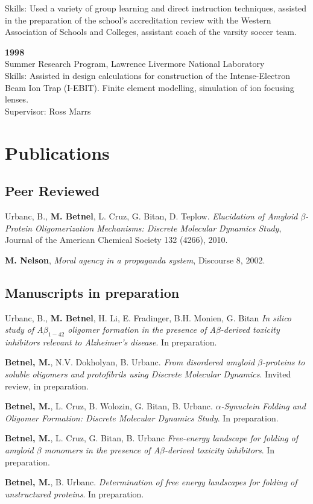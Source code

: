 \documentclass[letterpaper]{article}
\renewenvironment{itemize}{
  \begin{list}{}{
    \setlength{\leftmargin}{1.5em}
  }
}{
  \end{list}
}
\begin{document}
\begin{itemize}
	Skills: Used a variety of group learning and direct instruction techniques, assisted in the preparation of the school's accreditation review with the Western Association of Schools and Colleges, assistant coach of the varsity soccer team.  
	\item \textbf{1998} \\
	Summer Research Program, Lawrence Livermore National Laboratory \\
	Skills: Assisted in design calculations for construction of the Intense-Electron Beam Ion Trap (I-EBIT).  Finite element modelling, simulation of ion focusing lenses.  \\
	Supervisor: Ross Marrs
\end{itemize}

\section*{Publications}
\subsection*{Peer Reviewed}
\begin{itemize}
	\item Urbanc, B., \textbf{M. Betnel}, L. Cruz, G. Bitan, D. Teplow.  
\emph{Elucidation of Amyloid $\beta$-Protein Oligomerization Mechanisms: Discrete Molecular Dynamics Study}, Journal of the American Chemical Society  132 (4266), 2010.     
	\item \textbf{M. Nelson}, \emph{Moral agency in a propaganda system}, Discourse 8, 2002.
\end{itemize}

\subsection*{Manuscripts in preparation}
\begin{itemize}
	\item Urbanc, B., \textbf{M. Betnel}, H. Li, E. Fradinger, B.H. Monien, G. Bitan  
	\emph{In silico study of A$\beta_{1 − 42}$ oligomer formation in the presence of 
	A$\beta$-derived toxicity inhibitors relevant to Alzheimer's disease}.  
	In preparation.  
	\item \textbf{Betnel, M.}, N.V. Dokholyan, B. Urbanc.  
	\emph{From disordered amyloid $\beta$-proteins to soluble oligomers and 
	protofibrils using Discrete Molecular Dynamics}.  
	Invited review, in preparation.  
	\item \textbf{Betnel, M.}, L. Cruz, B. Wolozin, G. Bitan, B. Urbanc.  
	\emph{$\alpha$-Synuclein Folding and Oligomer Formation: Discrete Molecular Dynamics Study}.  
	In preparation.  
	\item \textbf{Betnel, M.}, L. Cruz, G. Bitan, B. Urbanc  
	\emph{Free-energy landscape for folding of amyloid $\beta$ monomers 
	in the presence of A$\beta$-derived toxicity inhibitors}.  
	In preparation.  
	\item \textbf{Betnel, M.}, B. Urbanc. 
	\emph{Determination of free energy landscapes for folding of 
	unstructured proteins}.
	In preparation.  
\end{itemize}
\end{document}
